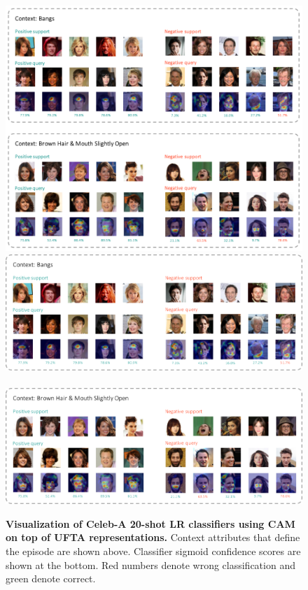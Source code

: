 \begin{figure}[t]
\centering
\iflatexml
\includegraphics[width=6\linewidth]{figures/additional_viz_celeb.png}
\else
\includegraphics[width=0.9\linewidth]{figures/additional_viz_celeb_1.pdf}\\
\quad \\
\includegraphics[width=0.9\linewidth]{figures/additional_viz_celeb_2.pdf}
\fi
\caption{\textbf{Visualization of Celeb-A 20-shot LR classifiers using CAM on
top of UFTA representations.} Context attributes that define the episode are
shown above. Classifier sigmoid confidence scores are shown at the bottom. Red
numbers denote wrong classification and green denote correct. }
\label{fig:celeb-a-additional}
\end{figure}
